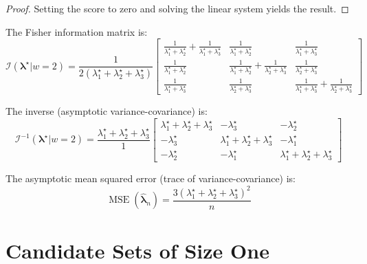 \documentclass[12pt]{article}
\newcommand{\tparam}[1]{{#1}^{\star}}  %
\newcommand{\expomle}{\boldsymbol{\hat{\lambda}}_n}
\newcommand{\infomatrx}{\mathcal{I}}
\renewcommand{\vec}[1]{\boldsymbol{#1}}
\DeclareMathOperator{\MSE}{\mathrm{MSE}}
\theoremstyle{definition}
\begin{document}
\begin{proof}
Setting the score to zero and solving the linear system yields the result.
\end{proof}

The Fisher information matrix is:
\begin{equation}
\infomatrx(\tparam{\vec{\lambda}} | w=2) = \frac{1}{2(\tparam{\lambda}_1 + \tparam{\lambda}_2 + \tparam{\lambda}_3)}
\begin{bmatrix}
\frac{1}{\tparam{\lambda}_1+\tparam{\lambda}_2}+\frac{1}{\tparam{\lambda}_1+\tparam{\lambda}_3} & \frac{1}{\tparam{\lambda}_1+\tparam{\lambda}_2} & \frac{1}{\tparam{\lambda}_1+\tparam{\lambda}_3}\\
\frac{1}{\tparam{\lambda}_1+\tparam{\lambda}_2} & \frac{1}{\tparam{\lambda}_1+\tparam{\lambda}_2}+\frac{1}{\tparam{\lambda}_2+\tparam{\lambda}_3} & \frac{1}{\tparam{\lambda}_2+\tparam{\lambda}_3}\\
\frac{1}{\tparam{\lambda}_1+\tparam{\lambda}_3} & \frac{1}{\tparam{\lambda}_2+\tparam{\lambda}_3} & \frac{1}{\tparam{\lambda}_1+\tparam{\lambda}_3}+\frac{1}{\tparam{\lambda}_2+\tparam{\lambda}_3}
\end{bmatrix}
\end{equation}

The inverse (asymptotic variance-covariance) is:
\begin{equation}
\label{eq:expo_vcov_3comp_w2}
\infomatrx^{-1}(\tparam{\vec{\lambda}} | w=2) = \frac{\tparam{\lambda}_1+\tparam{\lambda}_2+\tparam{\lambda}_3}{1}
\begin{bmatrix}
\tparam{\lambda}_1+\tparam{\lambda}_2+\tparam{\lambda}_3 & -\tparam{\lambda}_3 & -\tparam{\lambda}_2\\
-\tparam{\lambda}_3 & \tparam{\lambda}_1+\tparam{\lambda}_2+\tparam{\lambda}_3 & -\tparam{\lambda}_1\\
-\tparam{\lambda}_2 & -\tparam{\lambda}_1 & \tparam{\lambda}_1+\tparam{\lambda}_2+\tparam{\lambda}_3
\end{bmatrix}
\end{equation}

The asymptotic mean squared error (trace of variance-covariance) is:
\begin{equation}
\MSE(\expomle) = \frac{3(\tparam{\lambda}_1 + \tparam{\lambda}_2 + \tparam{\lambda}_3)^2}{n}
\end{equation}

\section{Candidate Sets of Size One}
\end{document}
